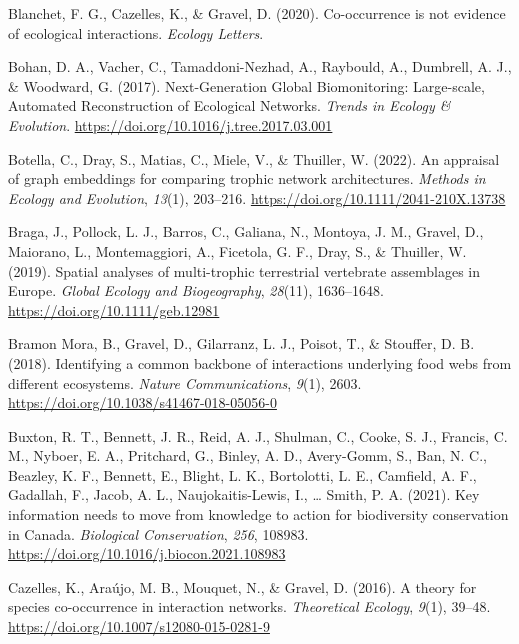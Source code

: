 \documentclass[10pt,oneside]{article}
\newlength{\cslhangindent}
\newenvironment{CSLReferences}[2] %
 {%
  \setlength{\parindent}{0pt}
  \ifodd #1 \everypar{\setlength{\hangindent}{\cslhangindent}}\ignorespaces\fi
  \ifnum #2 > 0
  \setlength{\parskip}{#2\baselineskip}
  \fi
 }%
 {}
\begin{document}
\begin{CSLReferences}{1}{0}
\leavevmode{}%
Blanchet, F. G., Cazelles, K., \& Gravel, D. (2020). Co-occurrence is
not evidence of ecological interactions. \emph{Ecology Letters}.

\leavevmode{}%
Bohan, D. A., Vacher, C., Tamaddoni-Nezhad, A., Raybould, A., Dumbrell,
A. J., \& Woodward, G. (2017). Next-Generation Global Biomonitoring:
Large-scale, Automated Reconstruction of Ecological Networks.
\emph{Trends in Ecology \& Evolution}.
\url{https://doi.org/10.1016/j.tree.2017.03.001}

\leavevmode{}%
Botella, C., Dray, S., Matias, C., Miele, V., \& Thuiller, W. (2022). An
appraisal of graph embeddings for comparing trophic network
architectures. \emph{Methods in Ecology and Evolution}, \emph{13}(1),
203--216. \url{https://doi.org/10.1111/2041-210X.13738}

\leavevmode{}%
Braga, J., Pollock, L. J., Barros, C., Galiana, N., Montoya, J. M.,
Gravel, D., Maiorano, L., Montemaggiori, A., Ficetola, G. F., Dray, S.,
\& Thuiller, W. (2019). Spatial analyses of multi-trophic terrestrial
vertebrate assemblages in Europe. \emph{Global Ecology and
Biogeography}, \emph{28}(11), 1636--1648.
\url{https://doi.org/10.1111/geb.12981}

\leavevmode{}%
Bramon Mora, B., Gravel, D., Gilarranz, L. J., Poisot, T., \& Stouffer,
D. B. (2018). Identifying a common backbone of interactions underlying
food webs from different ecosystems. \emph{Nature Communications},
\emph{9}(1), 2603. \url{https://doi.org/10.1038/s41467-018-05056-0}

\leavevmode{}%
Buxton, R. T., Bennett, J. R., Reid, A. J., Shulman, C., Cooke, S. J.,
Francis, C. M., Nyboer, E. A., Pritchard, G., Binley, A. D., Avery-Gomm,
S., Ban, N. C., Beazley, K. F., Bennett, E., Blight, L. K., Bortolotti,
L. E., Camfield, A. F., Gadallah, F., Jacob, A. L., Naujokaitis-Lewis,
I., \ldots{} Smith, P. A. (2021). Key information needs to move from
knowledge to action for biodiversity conservation in Canada.
\emph{Biological Conservation}, \emph{256}, 108983.
\url{https://doi.org/10.1016/j.biocon.2021.108983}

\leavevmode{}%
Cazelles, K., Araújo, M. B., Mouquet, N., \& Gravel, D. (2016). A theory
for species co-occurrence in interaction networks. \emph{Theoretical
Ecology}, \emph{9}(1), 39--48.
\url{https://doi.org/10.1007/s12080-015-0281-9}


\end{CSLReferences}
\end{document}
